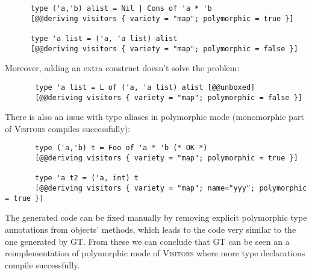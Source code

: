 \begin{itemize}
   \begin{lstlisting}
      type ('a,'b) alist = Nil | Cons of 'a * 'b
      [@@deriving visitors { variety = "map"; polymorphic = true }]

      type 'a list = ('a, 'a list) alist
      [@@deriving visitors { variety = "map"; polymorphic = false }]
   \end{lstlisting}
   
   Moreover, adding an extra construct doesn't solve the problem:
   
    \begin{lstlisting}
       type 'a list = L of ('a, 'a list) alist [@@unboxed]
       [@@deriving visitors { variety = "map"; polymorphic = false }]
    \end{lstlisting}
    
    There is also an issue with type aliases in polymorphic mode (monomorphic part of \textsc{Visitors} compiles successfully):
    
    \begin{lstlisting}
       type ('a,'b) t = Foo of 'a * 'b (* OK *)
       [@@deriving visitors { variety = "map"; polymorphic = true }]
       
       type 'a t2 = ('a, int) t
       [@@deriving visitors { variety = "map"; name="yyy"; polymorphic = true }]
    \end{lstlisting}
    
    The generated code can be fixed manually by removing explicit polymorphic type annotations from objects' methods, which leads to the code
    very similar to the one generated by \textsc{GT}. From these we can conclude that \textsc{GT} can be seen an a reimplementation of polymorphic
    mode of \textsc{Visitors} where more type declarations compile successfully.
    
\end{itemize}
